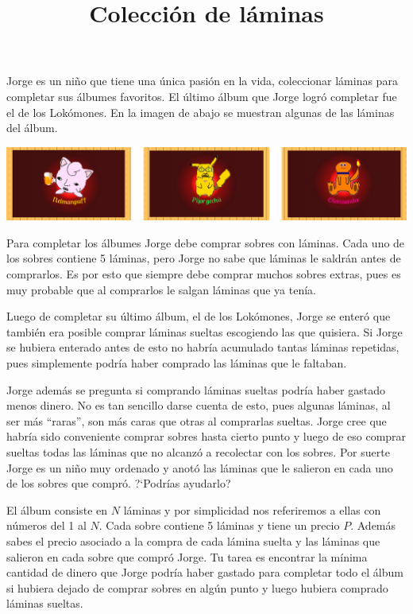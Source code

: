 \documentclass{oci}
\title{Colección de láminas}
\begin{document}
\begin{problemDescription}
Jorge es un niño que tiene una única pasión en la vida, coleccionar láminas para completar sus álbumes favoritos.
El último álbum que Jorge logró completar fue el de los Lokómones.
En la imagen de abajo se muestran algunas de las láminas del álbum.

\begin{center}
\includegraphics[scale=0.5]{locomons-laminas.png}
\end{center}

Para completar los álbumes Jorge debe comprar sobres con láminas.
Cada uno de los sobres contiene 5 láminas, pero Jorge no sabe que láminas le saldrán antes de comprarlos.
Es por esto que siempre debe comprar muchos sobres extras, pues es muy probable que al comprarlos le salgan láminas que ya tenía.

Luego de completar su último álbum, el de los Lokómones, Jorge se enteró que también era posible comprar láminas sueltas escogiendo las que quisiera.
Si Jorge se hubiera enterado antes de esto no habría acumulado tantas láminas repetidas, pues simplemente podría haber comprado las láminas que le faltaban.

Jorge además se pregunta si comprando láminas sueltas podría haber gastado menos dinero.
No es tan sencillo darse cuenta de esto, pues algunas láminas, al ser más ``raras'', son más caras que otras al comprarlas sueltas.
Jorge cree que habría sido conveniente comprar sobres hasta cierto punto y luego de eso comprar sueltas todas las láminas que no alcanzó a recolectar con los sobres.
Por suerte Jorge es un niño muy ordenado y anotó las láminas que le salieron en cada uno de los sobres que compró. ?`Podrías ayudarlo?

El álbum consiste en $N$ láminas y por simplicidad nos referiremos a ellas con números del 1 al $N$.
Cada sobre contiene 5 láminas y tiene un precio $P$.
Además sabes el precio asociado a la compra de cada lámina suelta y las láminas que salieron en cada sobre que compró Jorge.
Tu tarea es encontrar la mínima cantidad de dinero que Jorge podría haber gastado para completar todo el álbum si hubiera dejado de comprar sobres en algún punto y luego hubiera comprado láminas sueltas.
\end{problemDescription}
\end{document}
